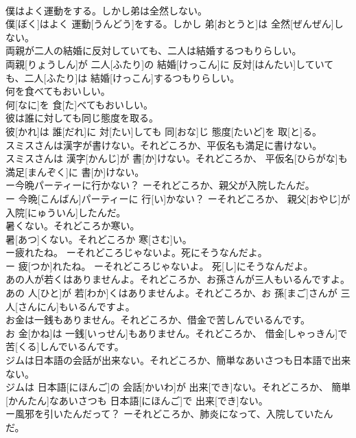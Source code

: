 \documentclass[8pt]{extreport}
\begin{document}
\begin{CJK}{UTF8}{min}
\\	僕はよく運動をする。しかし弟は全然しない。	
\\	僕[ぼく]はよく 運動[うんどう]をする。しかし 弟[おとうと]は 全然[ぜんぜん]しない。
\\	両親が二人の結婚に反対していても、二人は結婚するつもりらしい。	
\\	両親[りょうしん]が 二人[ふたり]の 結婚[けっこん]に 反対[はんたい]していても、二人[ふたり]は 結婚[けっこん]するつもりらしい。
\\	何を食べてもおいしい。	
\\	何[なに]を 食[た]べてもおいしい。
\\	彼は誰に対しても同じ態度を取る。	
\\	彼[かれ]は 誰[だれ]に 対[たい]しても 同[おな]じ 態度[たいど]を 取[と]る。
\\	スミスさんは漢字が書けない。それどころか、平仮名も満足に書けない。	
\\	スミスさんは 漢字[かんじ]が 書[か]けない。それどころか、 平仮名[ひらがな]も 満足[まんぞく]に 書[か]けない。
\\	ー今晩パーティーに行かない？ ーそれどころか、親父が入院したんだ。	
\\	ー 今晩[こんばん]パーティーに 行[い]かない？ ーそれどころか、 親父[おやじ]が 入院[にゅういん]したんだ。
\\	暑くない。それどころか寒い。	
\\	暑[あつ]くない。それどころか 寒[さむ]い。
\\	ー疲れたね。 ーそれどころじゃないよ。死にそうなんだよ。	
\\	ー 疲[つか]れたね。 ーそれどころじゃないよ。 死[し]にそうなんだよ。
\\	あの人が若くはありませんよ。それどころか、お孫さんが三人もいるんですよ。	
\\	あの 人[ひと]が 若[わか]くはありませんよ。それどころか、お 孫[まご]さんが 三人[さんにん]もいるんですよ。
\\	お金は一銭もありません。それどころか、借金で苦しんでいるんです。	
\\	お 金[かね]は 一銭[いっせん]もありません。それどころか、 借金[しゃっきん]で 苦[くる]しんでいるんです。
\\	ジムは日本語の会話が出来ない。それどころか、簡単なあいさつも日本語で出来ない。	
\\	ジムは 日本語[にほんご]の 会話[かいわ]が 出来[でき]ない。それどころか、 簡単[かんたん]なあいさつも 日本語[にほんご]で 出来[でき]ない。
\\	ー風邪を引いたんだって？ ーそれどころか、肺炎になって、入院していたんだ。	

\end{CJK}
\end{document}
